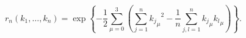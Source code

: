 \begin{equation}
\label{rn}
r_n(k_1,\dotsc,k_n)=\exp\left\{-\frac{1}{2}
\sum_{\mu=0}^3\left(\sum_{j=1}^n{{k_j}_\mu}^2-
\frac{1}{n}\sum_{j,l=1}^n{k_j}_\mu {k_l}_\mu\right)\right\}.
\end{equation}

